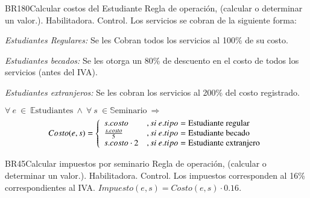 \begin{BussinesRule}{BR180}{Calcular costos del Estudiante}
	\BRitem[Tipo:] Regla de operación, (calcular o determinar un valor.).
	\BRitem[Clase:] Habilitadora. 
	\BRitem[Nivel:] Control. %
	\BRitem[Descripción:] Los servicios se cobran de la siguiente forma:
		\begin{Citemize}
			\item {\em Estudiantes Regulares:} Se les Cobran todos los servicios al 100\% de su costo.
			\item {\em Estudiantes becados:} Se les otorga un 80\% de descuento en el costo de todos los servicios (antes del IVA).
			\item {\em Estudiantes extranjeros:} Se les cobran los servicios al 200\% del costo registrado.
		\end{Citemize}
	\BRitem[Sentencia:] $\forall~e~\in~\mathbb{E}\textrm{studiantes}~\land~\forall~s~\in \mathbb{S}\textrm{eminario}~\Rightarrow$
		\begin{displaymath}
			Costo(e,s) = \left\{ \begin{array}{ll}
			s.costo & , si~e.tipo = \textrm{Estudiante regular}\\
			{s.costo}\over{5} & , si~e.tipo = \textrm{Estudiante becado}\\
			s.costo \cdot 2 & , si~e.tipo = \textrm{Estudiante extranjero}
			\end{array} \right.
		\end{displaymath}
	
	
\end{BussinesRule}

\begin{BussinesRule}{BR45}{Calcular impuestos por seminario}
	\BRitem[Tipo:] Regla de operación, (calcular o determinar un valor.).
	\BRitem[Clase:] Habilitadora. 
	\BRitem[Nivel:] Control. %
	\BRitem[Descripción:] Los impuestos corresponden al 16\% correspondientes al IVA.
	\BRitem[Sentencia:] $Impuesto(e, s) = Costo(e, s)\cdot0.16$.
	
	
\end{BussinesRule}

